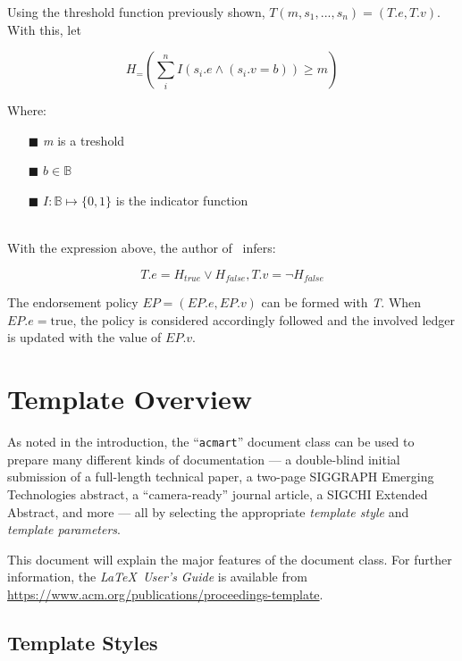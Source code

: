 \documentclass[sigconf, nonacm]{acmart}
\begin{document}
Using the threshold function previously shown, $T(m,s_1,... ,s_n) = (T.e,T.v)$. With this, let

\begin{displaymath}
  H_ = \left(\sum_{i}^{n} I(s_i.e \wedge (s_i.v = b)) \geq m \right)
\end{displaymath}

Where:

\begin{enumerate}
  \item[$\blacksquare$] \textit{m} is a treshold
  \item[$\blacksquare$] $b \in \mathbb{B}$
  \item[$\blacksquare$] $I : \mathbb{B} \mapsto \{0,1\}$  is the indicator function
\end{enumerate}
\  \\ %

With the expression above, the author of~\cite{Kawahara2020} infers:

\begin{displaymath}
  T.e = H_{true} \vee H_{false},  T.v = \neg{H_{false}}
\end{displaymath}

The  endorsement policy $EP = (EP.e,EP.v)$ can be formed with \textit{T}. When $EP.e = \textrm{true}$, the policy
is considered accordingly followed and the involved ledger is updated with the value of $EP.v$.

\section{Template Overview}
As noted in the introduction, the ``\verb|acmart|'' document class can
be used to prepare many different kinds of documentation --- a
double-blind initial submission of a full-length technical paper, a
two-page SIGGRAPH Emerging Technologies abstract, a ``camera-ready''
journal article, a SIGCHI Extended Abstract, and more --- all by
selecting the appropriate {\itshape template style} and {\itshape
    template parameters}.

This document will explain the major features of the document
class. For further information, the {\itshape \LaTeX\ User's Guide} is
available from
\url{https://www.acm.org/publications/proceedings-template}.

\subsection{Template Styles}
\end{document}
